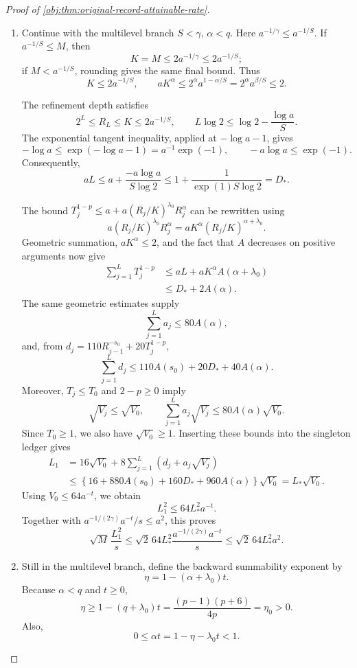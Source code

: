 \begin{proof}[Proof of \cref{obj:thm:original-record-attainable-rate}]
\begin{enumerate}
\item Continue with the multilevel branch \(S<\gamma\), \(\alpha<q\).
Here \(a^{-1/\gamma}\le a^{-1/S}\). If \(a^{-1/S}\le M\), then
\[
K=M\le2a^{-1/\gamma}\le2a^{-1/S};
\]
if \(M<a^{-1/S}\), rounding gives the same final bound. Thus
\[
K\le2a^{-1/S},
\qquad
aK^\alpha
\le2^\alpha a^{1-\alpha/S}
=2^\alpha a^{\beta/S}\le2.
\]

The refinement depth satisfies
\[
2^L\le R_L\le K\le2a^{-1/S},
\qquad
L\log2\le\log2-\frac{\log a}{S}.
\]
The exponential tangent inequality, applied at \(-\log a-1\), gives
\[
-\log a
\le\exp(-\log a-1)=a^{-1}\exp(-1),
\qquad
-a\log a\le\exp(-1).
\]
Consequently,
\[
aL
\le a+\frac{-a\log a}{S\log2}
\le1+\frac{1}{\exp(1)S\log2}
=D_*.
\]

The bound \(T_j^{1-p}\le a+a(R_j/K)^{\lambda_0}R_j^\alpha\) can be rewritten using
\[
a(R_j/K)^{\lambda_0}R_j^\alpha
=aK^\alpha(R_j/K)^{\alpha+\lambda_0}.
\]
Geometric summation, \(aK^\alpha\le2\), and the fact that \(A\) decreases on positive arguments now give
\[
\begin{aligned}
\sum_{j=1}^{L}T_j^{1-p}
&\le aL+aK^\alpha A(\alpha+\lambda_0)\\
&\le D_*+2A(\alpha).
\end{aligned}
\]
The same geometric estimates supply
\[
\sum_{j=1}^{L}a_j\le80A(\alpha),
\]
and, from \(d_j=110R_{j-1}^{-s_0}+20T_j^{1-p}\),
\[
\sum_{j=1}^{L}d_j
\le110A(s_0)+20D_*+40A(\alpha).
\]
Moreover, \(T_j\le T_0\) and \(2-p\ge0\) imply
\[
\sqrt{V_j}\le\sqrt{V_0},
\qquad
\sum_{j=1}^{L}a_j\sqrt{V_j}
\le80A(\alpha)\sqrt{V_0}.
\]
Since \(T_0\ge1\), we also have \(\sqrt{V_0}\ge1\).
Inserting these bounds into the singleton ledger gives
\[
\begin{aligned}
L_1
&=16\sqrt{V_0}
 +8\sum_{j=1}^{L}(d_j+a_j\sqrt{V_j})\\
&\le
\left\{16+880A(s_0)+160D_*+960A(\alpha)\right\}
\sqrt{V_0}
=L_*\sqrt{V_0}.
\end{aligned}
\]
Using \(V_0\le64a^{-t}\), we obtain
\[
L_1^2\le64L_*^2a^{-t}.
\]
Together with \(a^{-1/(2\gamma)}a^{-t}/s\le a^2\), this proves
\[
\sqrt M\,\frac{L_1^2}{s}
\le\sqrt2\,64L_*^2
\frac{a^{-1/(2\gamma)}a^{-t}}{s}
\le\sqrt2\,64L_*^2a^2.
\]

\item Still in the multilevel branch, define the backward summability exponent by
\[
\eta=1-(\alpha+\lambda_0)t.
\]
Because \(\alpha<q\) and \(t\ge0\),
\[
\eta\ge1-(q+\lambda_0)t
=\frac{(p-1)(p+6)}{4p}
=\eta_0>0.
\]
Also,
\[
0\le\alpha t=1-\eta-\lambda_0t<1.
\]


\end{enumerate}
\end{proof}
